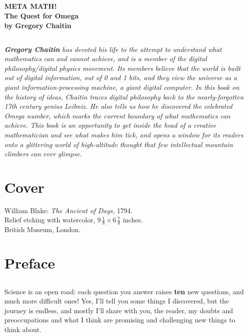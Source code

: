 \documentclass[12pt]{book}
\begin{document}
\section*{}

\textbf{\Huge
META MATH!\vspace{3mm}
\\
\Large
The Quest for Omega
\vspace{5mm}
\\
by Gregory Chaitin}

\section*{}

\emph{\textbf{Gregory Chaitin} has devoted his life to the attempt to understand what mathematics
can and cannot achieve, and is a member of the digital philosophy/digital physics movement.
Its members believe that
the world is built out of digital information, out of 0 and 1 bits,
and they view 
the universe as a giant information-processing machine, a giant digital computer.
In this book on the history of ideas, Chaitin
traces digital philosophy back to the 
nearly-forgotten
17th century genius Leibniz. 
He also tells us how he discovered the celebrated Omega number, which marks the current boundary
of what mathematics can achieve.
This book is an opportunity to get inside the head of a creative mathematician
and see what makes him tick,
and opens a window for its readers 
onto a glittering world of high-altitude thought that few intellectual mountain climbers
can ever glimpse.}

\chapter*{Cover}

William Blake: \emph{The Ancient of Days,} 1794.
\\
Relief etching with watercolor, $9\,\frac{1}{8} \times 6\,\frac{7}{8}$ inches.
\\
British Museum, London.

\chapter*{Preface}

\section*{}
\section*{}
Science is an open road:
each question you answer raises \textbf{ten} new questions,
and much more difficult ones!  Yes, I'll tell you some things I discovered, but
the journey is endless, and mostly I'll share with you, the reader,
my doubts and preoccupations and what I think are promising and challenging
new things to think about.
\end{document}
